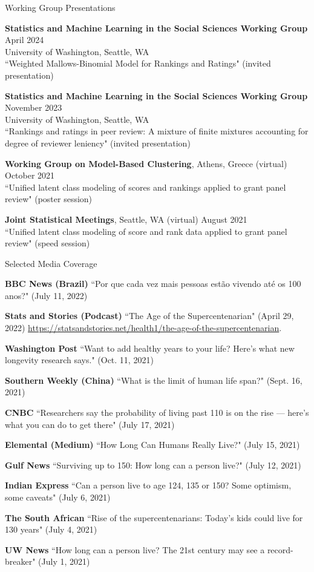 \documentclass{resume} %
\begin{document}
\begin{rSection}{Working Group Presentations}

\textbf{Statistics and Machine Learning in the Social Sciences Working Group} \hfill{April 2024}\\
University of Washington, Seattle, WA \\
``Weighted Mallows-Binomial Model for Rankings and Ratings" (invited presentation)

\textbf{Statistics and Machine Learning in the Social Sciences Working Group} \hfill{November 2023}\\
University of Washington, Seattle, WA \\
``Rankings and ratings in peer review: A mixture of finite mixtures accounting for degree of reviewer leniency" (invited presentation)

\textbf{Working Group on Model-Based Clustering}, Athens, Greece (virtual)  \hfill {October 2021}\\
``Unified latent class modeling of scores and rankings applied to grant panel review" (poster session)

\textbf{Joint Statistical Meetings}, Seattle, WA (virtual) \hfill {August 2021}\\
``Unified latent class modeling of score and rank data applied to grant panel review" (speed session)

\end{rSection}


\begin{rSection}{Selected Media Coverage}

\textbf{BBC News (Brazil)} ``Por que cada vez mais pessoas est\~{a}o vivendo at\'{e} os 100 anos?" (July 11, 2022)

\textbf{Stats and Stories (Podcast)} ``The Age of the Supercentenarian" (April 29, 2022) \url{https://statsandstories.net/health1/the-age-of-the-supercentenarian}.

\textbf{Washington Post} ``Want to add healthy years to your life? Here’s what new longevity research says." (Oct. 11, 2021)

\textbf{Southern Weekly (China)} ``What is the limit of human life span?" (Sept. 16, 2021)

\textbf{CNBC} ``Researchers say the probability of living past 110 is on the rise — here’s what you can do to get there" (July 17, 2021)

\textbf{Elemental (Medium)} ``How Long Can Humans Really Live?" (July 15, 2021)

\textbf{Gulf News} ``Surviving up to 150: How long can a person live?" (July 12, 2021)

\textbf{Indian Express} ``Can a person live to age 124, 135 or 150? Some optimism, some caveats" (July 6, 2021)

\textbf{The South African} ``Rise of the supercentenarians: Today’s kids could live for 130 years" (July 4, 2021)

\textbf{UW News} ``How long can a person live? The 21st century may see a record-breaker" (July 1, 2021)

\end{rSection}
\end{document}
